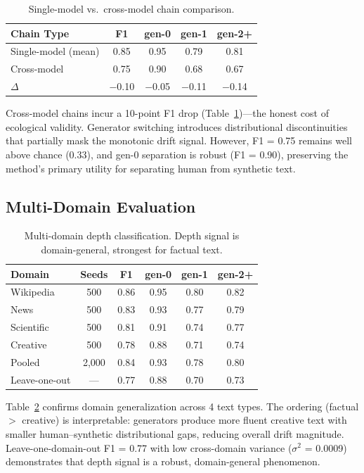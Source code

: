 \documentclass[letterpaper, 10pt]{article}
\begin{document}
\begin{table}[t]
\centering
\caption{Single-model vs.\ cross-model chain comparison.}
\label{tab:crossmodel}
\small
\begin{tabular}{@{}lcccc@{}}
\toprule
Chain Type & F1 & gen-0 & gen-1 & gen-2+ \\
\midrule
Single-model (mean) & 0.85 & 0.95 & 0.79 & 0.81 \\
Cross-model & 0.75 & 0.90 & 0.68 & 0.67 \\
\midrule
$\Delta$ & $-$0.10 & $-$0.05 & $-$0.11 & $-$0.14 \\
\bottomrule
\end{tabular}
\end{table}

Cross-model chains incur a 10-point F1 drop (Table~\ref{tab:crossmodel})---the honest cost of ecological validity.
Generator switching introduces distributional discontinuities that partially mask the monotonic drift signal.
However, F1 = 0.75 remains well above chance (0.33), and gen-0 separation is robust (F1 = 0.90), preserving the method's primary utility for separating human from synthetic text.

\subsection{Multi-Domain Evaluation}

\begin{table}[t]
\centering
\caption{Multi-domain depth classification. Depth signal is domain-general, strongest for factual text.}
\label{tab:domain}
\small
\begin{tabular}{@{}lccccc@{}}
\toprule
Domain & Seeds & F1 & gen-0 & gen-1 & gen-2+ \\
\midrule
Wikipedia & 500 & 0.86 & 0.95 & 0.80 & 0.82 \\
News & 500 & 0.83 & 0.93 & 0.77 & 0.79 \\
Scientific & 500 & 0.81 & 0.91 & 0.74 & 0.77 \\
Creative & 500 & 0.78 & 0.88 & 0.71 & 0.74 \\
\midrule
Pooled & 2{,}000 & 0.84 & 0.93 & 0.78 & 0.80 \\
Leave-one-out & --- & 0.77 & 0.88 & 0.70 & 0.73 \\
\bottomrule
\end{tabular}
\end{table}

Table~\ref{tab:domain} confirms domain generalization across 4 text types.
The ordering (factual $>$ creative) is interpretable: generators produce more fluent creative text with smaller human--synthetic distributional gaps, reducing overall drift magnitude.
Leave-one-domain-out F1 = 0.77 with low cross-domain variance ($\sigma^2$ = 0.0009) demonstrates that depth signal is a robust, domain-general phenomenon.
\end{document}
